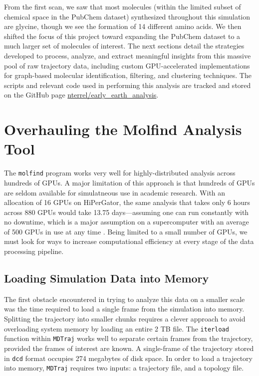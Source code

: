From the first scan, we saw that most molecules (within the limited subset of chemical space in the PubChem dataset) synthesized throughout this simulation are glycine, though we see the formation of 14 different amino acids.
We then shifted the focus of this project toward expanding the PubChem dataset to a much larger set of molecules of interest.
The next sections detail the strategies developed to process, analyze, and extract meaningful insights from this massive pool of raw trajectory data, including custom GPU-accelerated implementations for graph-based molecular identification, filtering, and clustering techniques.
The scripts and relevant code used in performing this analysis are tracked and stored on the GitHub page \href{https://github.com/nterrel/early_earth_analysis}{nterrel/early\_earth\_analysis}.

\section{Overhauling the Molfind Analysis Tool}
\label{sec:molfind_updates}

The \verb|molfind| program works very well for highly-distributed analysis across hundreds of GPUs.
A major limitation of this approach is that hundreds of GPUs are seldom available for simulatneous use in academic research.
With an allocation of 16 GPUs on HiPerGator, the same analysis that takes only 6 hours across 880 GPUs would take 13.75 days---assuming one can run constantly with no downtime, which is a major assumption on a supercomputer with an average of 500 GPUs in use at any time \cite{hpg_metrics}.
Being limited to a small number of GPUs, we must look for ways to increase computational efficiency at every stage of the data processing pipeline. 

\subsection{Loading Simulation Data into Memory}
\label{subsec:top_loader}

The first obstacle encountered in trying to analyze this data on a smaller scale was the time required to load a single frame from the simulation into memory. 
Splitting the trajectory into smaller chunks requires a clever approach to avoid overloading system memory by loading an entire 2 TB file. 
The \verb|iterload| function within \verb|MDTraj| \cite{mdtraj} works well to separate certain frames from the trajectory, provided the frames of interest are known.
A single-frame of the trajectory stored in \verb|dcd| format occupies 274 megabytes of disk space.
In order to load a trajectory into memory, \verb|MDTraj| requires two inputs: a trajectory file, and a topology file.


